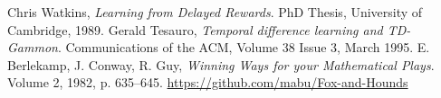 \documentclass[a4paper]{article}
\begin{document}
\begin{thebibliography}{9}
    Chris Watkins,
    {\em Learning from Delayed Rewards}.
    PhD Thesis, University of Cambridge, 1989.
    Gerald Tesauro,
    {\em Temporal difference learning and TD-Gammon}.
    Communications of the ACM,
    Volume 38 Issue 3, March 1995.
    E. Berlekamp, J. Conway, R. Guy,
    {\em Winning Ways for your Mathematical Plays}.
    Volume 2, 1982, p. 635--645.
    \url{https://github.com/mabu/Fox-and-Hounds}
\end{thebibliography}
\end{document}
